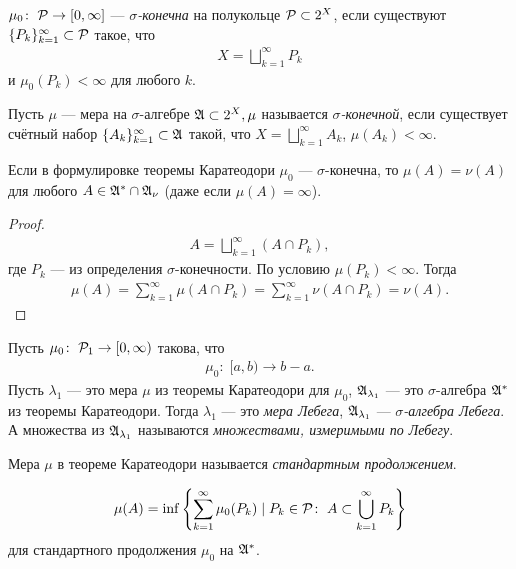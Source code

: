 \begin{df}
 $\mu_0 \colon\; \mathcal{P} \to [0, \infty]$ --- \textit{$\sigma$-конечна} на полукольце $\mathcal{P} \subset 2^{X}$, если существуют $\{P_k\}_{k=1}^{\infty} \subset \mathcal{P} $ такое, что
 \begin{align*}
  X = \bigsqcup_{k=1}^{\infty} P_k
 \end{align*} и $\mu_0(P_k) < \infty$ для любого $k$.
\end{df}
\begin{df}
 Пусть $\mu$ --- мера на $\sigma$-алгебре $\mathfrak{A} \subset 2^{X}, \mu$ называется \textit{$\sigma$-конечной}, если существует счётный набор $\{A_k\}_{k=1}^{\infty} \subset \mathfrak{A} $ такой, что $X = \bigsqcup_{k=1}^{\infty} A_k $, $\mu(A_k) < \infty$.
\end{df}
\begin{crly}
 \label{corollary:sigma-finite-caratheodory-continuation-is-unique}
 Если в формулировке теоремы Каратеодори $\mu_0$ --- $\sigma$-конечна, то $\mu(A) = \nu(A)$ для любого $A \in \mathfrak{A}^{\ast} \cap \mathfrak{A}_{\nu}$ (даже если $\mu(A) = \infty$).
\end{crly}
\begin{proof}
 \begin{align*}
  A = \bigsqcup_{k=1}^{\infty} (A \cap P_k)
 ,\end{align*} где $P_k$ --- из определения $\sigma$-конечности. По условию  $\mu(P_k) < \infty$. Тогда
 \begin{align*}
  \mu(A) = \sum_{k=1}^{\infty} \mu(A \cap P_k) = \sum_{k=1}^{\infty} \nu(A \cap P_k) = \nu(A)
 .\end{align*}
\end{proof}
\begin{df}
 Пусть $\mu_0 \colon\; \mathcal{P}_1 \to [0, \infty)$ такова, что
 \begin{align*}
  \mu_0 \colon\; [a, b) \to b - a
 .\end{align*} Пусть $\lambda_1$ --- это мера  $\mu$ из теоремы Каратеодори для $\mu_0$, $\mathfrak{A}_{\lambda_1}$ --- это $\sigma$-алгебра $\mathfrak{A}^{\ast}$ из теоремы Каратеодори. Тогда $\lambda_1$ --- это \textit{мера Лебега}, $\mathfrak{A}_{\lambda_1}$ --- \textit{$\sigma$-алгебра Лебега}. А множества из $\mathfrak{A}_{\lambda_1}$ называются \textit{множествами, измеримыми по Лебегу}.
\end{df}
\begin{df}
 Мера $\mu$ в теореме Каратеодори называется \textit{стандартным продолжением}.
\end{df}
\begin{remrk}
 \label{remark:measure_explicit_formula}
 \begin{align*}
  \mu(A) = \inf \left\{ \sum_{k=1}^{\infty} \mu_0(P_k) \mid P_k \in \mathcal{P} \colon\; A \subset \bigcup_{k=1}^{\infty} P_k \right\}
 \end{align*}
 для стандартного продолжения $\mu_{0}$ на $\mathfrak{A}^{\ast}$.
\end{remrk}
